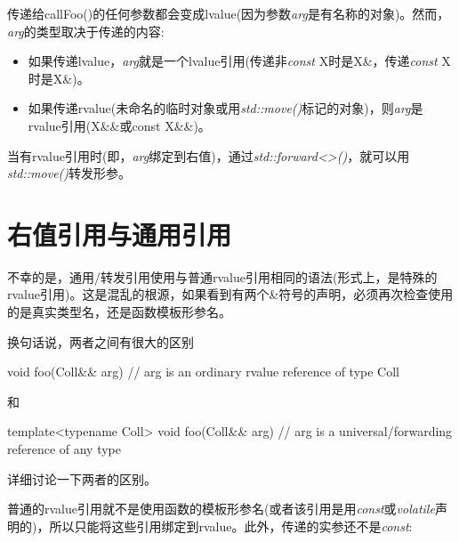 传递给callFoo()的任何参数都会变成lvalue(因为参数\textit{arg}是有名称的对象)。然而，\textit{arg}的类型取决于传递的内容:\par

\begin{itemize}
  \item 如果传递lvalue，\textit{arg}就是一个lvalue引用(传递非\textit{const} X时是X\&，传递\textit{const} X时是X\&)。
  \item 如果传递rvalue(未命名的临时对象或用\textit{std::move()}标记的对象)，则\textit{arg}是rvalue引用(X\&\&或const X\&\&)。
\end{itemize}

当有rvalue引用时(即，\textit{arg}绑定到右值)，通过\textit{std::\allowbreak{}forward<\allowbreak{}>(\allowbreak{})\allowbreak{}}，就可以用\textit{std::move()}转发形参。\par


\section{右值引用与通用引用}

不幸的是，通用/转发引用使用与普通rvalue引用相同的语法(形式上，是特殊的rvalue引用)。这是混乱的根源，如果看到有两个\&符号的声明，必须再次检查使用的是真实类型名，还是函数模板形参名。\par

换句话说，两者之间有很大的区别\par

\begin{codebox}[cpp]
void foo(Coll&& arg) // arg is an ordinary rvalue reference of type Coll
\end{codebox}

和\par

\begin{codebox}[cpp]
template<typename Coll>
void foo(Coll&& arg) // arg is a universal/forwarding reference of any type
\end{codebox}

详细讨论一下两者的区别。\par


普通的rvalue引用就不是使用函数的模板形参名(或者该引用是用\textit{const}或\textit{volatile}声明的)，所以只能将这些引用绑定到rvalue。此外，传递的实参还不是\textit{const}:\par


